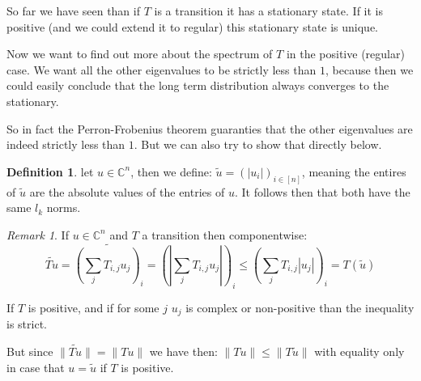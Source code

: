 \documentclass[a4paper,10pt]{article}
\newcommand{\C}{\mathbb{C}}
\theoremstyle{definition}
\newtheorem{mydef}{Definition}[section]
\theoremstyle{remark}
\newtheorem{remark}{Remark}
\theoremstyle{plain}
\begin{document}
So far we have seen than if $T$ is a transition it has a stationary state. If it
is positive (and we could extend it to regular) this stationary state is unique.

Now we want to find out more about the spectrum of $T$ in the positive (regular)
case. We want all the other eigenvalues to be strictly less than $1$, because
then we could easily conclude that the long term distribution always converges
to the stationary.

So in fact the Perron-Frobenius theorem guaranties that the other eigenvalues
are indeed strictly less than $1$. But we can also try to show that directly
below.

\begin{mydef}
let $u \in \C^n$, then we define:
$\tilde{u} = (|u_i|)_{i \in [n]}$, meaning the entires of $\tilde{u}$ are the
absolute values of the entries of $u$. It follows then that both have the same
$l_k$ norms.
\end{mydef}

\begin{remark}
\label{remark2}
If $u \in \C^n$ and $T$ a transition then componentwise:
$$\widetilde{Tu} = \widetilde{(\sum_j T_{i,j}u_j)_i} =
(|\sum_j T_{i,j}u_j|)_i \leq (\sum_j T_{i,j}|u_j|)_i
= T(\tilde{u})$$ 

If $T$ is positive, and
if for some $j$ $u_j$ is complex or non-positive than the inequality is strict.

But since $\|\widetilde{Tu}\| = \|Tu\|$ we have then:
$\|Tu\| \leq \|T\tilde{u}\|$ with equality only in case that $u = \tilde{u}$ if
$T$ is positive.
\end{remark}
\end{document}
